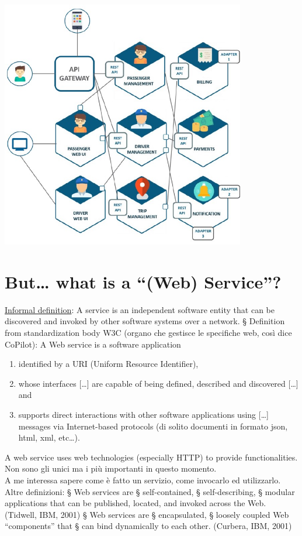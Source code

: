 \begin{center}
    \includegraphics[width=0.8\textwidth]{img/ServicesComputing3.jpg}
\end{center}

\section{But… what is a “(Web) Service”?}
\underline{Informal definition}: A service is an independent software entity that can be discovered and invoked by other software systems over a network.
§ Definition from standardization body W3C (organo che gestisce le specifiche web, così dice CoPilot): A Web service is a software application
\begin{enumerate}
    \item identified by a URI (Uniform Resource Identifier),
    \item whose interfaces […] are capable of being defined, described and discovered […] and
    \item supports direct interactions with other software applications using […] messages via Internet-based protocols (di solito documenti in formato json, html, xml, etc\dots).
\end{enumerate}
A web service uses web technologies (especially HTTP) to provide functionalities. Non sono gli unici ma i più importanti in questo momento.
\\A me interessa sapere come è fatto un servizio, come invocarlo ed utilizzarlo.
\\Altre definizioni:
§ Web services are
§ self-contained,
§ self-describing,
§ modular applications that can be published, located, and invoked across the Web. (Tidwell, IBM, 2001)
§ Web services are
§ encapsulated,
§ loosely coupled Web “components” that
§ can bind dynamically to each other. (Curbera, IBM, 2001)

